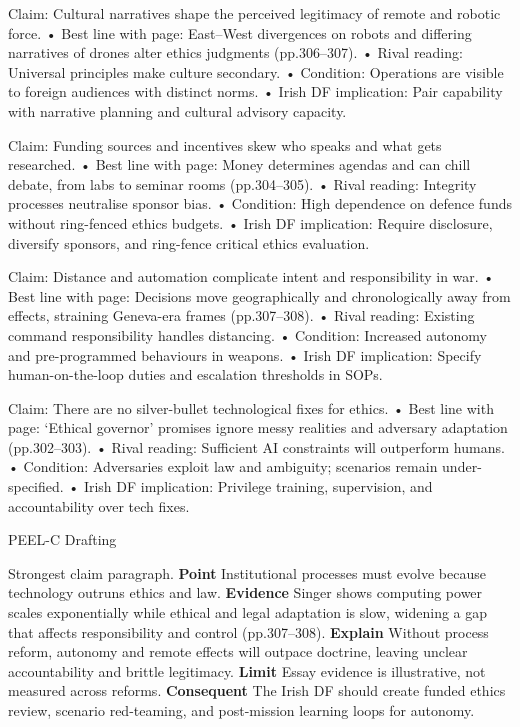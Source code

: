 Claim: Cultural narratives shape the perceived legitimacy of remote and robotic force.
• Best line with page: East–West divergences on robots and differing narratives of drones alter ethics judgments (pp.306–307).
• Rival reading: Universal principles make culture secondary.
• Condition: Operations are visible to foreign audiences with distinct norms.
• Irish DF implication: Pair capability with narrative planning and cultural advisory capacity.

Claim: Funding sources and incentives skew who speaks and what gets researched.
• Best line with page: Money determines agendas and can chill debate, from labs to seminar rooms (pp.304–305).
• Rival reading: Integrity processes neutralise sponsor bias.
• Condition: High dependence on defence funds without ring-fenced ethics budgets.
• Irish DF implication: Require disclosure, diversify sponsors, and ring-fence critical ethics evaluation.

Claim: Distance and automation complicate intent and responsibility in war.
• Best line with page: Decisions move geographically and chronologically away from effects, straining Geneva-era frames (pp.307–308).
• Rival reading: Existing command responsibility handles distancing.
• Condition: Increased autonomy and pre-programmed behaviours in weapons.
• Irish DF implication: Specify human-on-the-loop duties and escalation thresholds in SOPs.

Claim: There are no silver-bullet technological fixes for ethics.
• Best line with page: ‘Ethical governor’ promises ignore messy realities and adversary adaptation (pp.302–303).
• Rival reading: Sufficient AI constraints will outperform humans.
• Condition: Adversaries exploit law and ambiguity; scenarios remain under-specified.
• Irish DF implication: Privilege training, supervision, and accountability over tech fixes.

PEEL-C Drafting

Strongest claim paragraph.
\textbf{Point} Institutional processes must evolve because technology outruns ethics and law.
\textbf{Evidence} Singer shows computing power scales exponentially while ethical and legal adaptation is slow, widening a gap that affects responsibility and control (pp.307–308).
\textbf{Explain} Without process reform, autonomy and remote effects will outpace doctrine, leaving unclear accountability and brittle legitimacy.
\textbf{Limit} Essay evidence is illustrative, not measured across reforms. \textbf{Consequent} The Irish DF should create funded ethics review, scenario red-teaming, and post-mission learning loops for autonomy.


